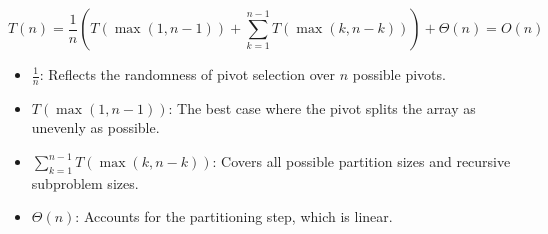 \begin{definition}
        \begin{equation*}
        T(n) = \frac{1}{n} \left( T(\max(1, n-1)) + \sum_{k=1}^{n-1} T(\max(k, n-k)) \right) + \Theta(n) = O(n)
        \end{equation*}

        \begin{itemize}
            \item \( \frac{1}{n} \): Reflects the randomness of pivot selection over \( n \) possible pivots.
            \item \( T(\max(1, n-1)) \): The best case where the pivot splits the array as unevenly as possible.
            \item \( \sum_{k=1}^{n-1} T(\max(k, n-k)) \): Covers all possible partition sizes and recursive subproblem sizes.
            \item \( \Theta(n) \): Accounts for the partitioning step, which is linear.
        \end{itemize}
    \end{definition}